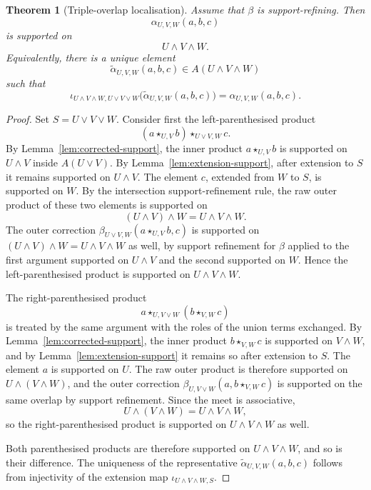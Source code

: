 \documentclass[11pt]{article}
\newtheorem{theorem}{Theorem}[section]
\begin{document}
\begin{theorem}[Triple-overlap localisation]\label{thm:triple-localisation}
Assume that \(\beta\) is support-refining. Then
\[
\alpha_{U,V,W}(a,b,c)
\]
is supported on
\[
U\wedge V\wedge W.
\]
Equivalently, there is a unique element
\[
\widetilde\alpha_{U,V,W}(a,b,c)\in A(U\wedge V\wedge W)
\]
such that
\[
\iota_{U\wedge V\wedge W,U\vee V\vee W}\bigl(\widetilde\alpha_{U,V,W}(a,b,c)\bigr)
=
\alpha_{U,V,W}(a,b,c).
\]
\end{theorem}

\begin{proof}
Set \(S=U\vee V\vee W\). Consider first the left-parenthesised product
\[
(a\star_{U,V}b)\star_{U\vee V,W}c.
\]
By Lemma~\ref{lem:corrected-support}, the inner product \(a\star_{U,V}b\) is supported on \(U\wedge V\) inside \(A(U\vee V)\). By Lemma~\ref{lem:extension-support}, after extension to \(S\) it remains supported on \(U\wedge V\). The element \(c\), extended from \(W\) to \(S\), is supported on \(W\). By the intersection support-refinement rule, the raw outer product of these two elements is supported on
\[
(U\wedge V)\wedge W=U\wedge V\wedge W.
\]
The outer correction \(\beta_{U\vee V,W}(a\star_{U,V}b,c)\) is supported on \((U\wedge V)\wedge W=U\wedge V\wedge W\) as well, by support refinement for \(\beta\) applied to the first argument supported on \(U\wedge V\) and the second supported on \(W\). Hence the left-parenthesised product is supported on \(U\wedge V\wedge W\).

The right-parenthesised product
\[
a\star_{U,V\vee W}(b\star_{V,W}c)
\]
is treated by the same argument with the roles of the union terms exchanged. By Lemma~\ref{lem:corrected-support}, the inner product \(b\star_{V,W}c\) is supported on \(V\wedge W\), and by Lemma~\ref{lem:extension-support} it remains so after extension to \(S\). The element \(a\) is supported on \(U\). The raw outer product is therefore supported on \(U\wedge (V\wedge W)\), and the outer correction \(\beta_{U,V\vee W}(a,b\star_{V,W}c)\) is supported on the same overlap by support refinement. Since the meet is associative,
\[
U\wedge (V\wedge W)=U\wedge V\wedge W,
\]
so the right-parenthesised product is supported on \(U\wedge V\wedge W\) as well.

Both parenthesised products are therefore supported on \(U\wedge V\wedge W\), and so is their difference. The uniqueness of the representative \(\widetilde\alpha_{U,V,W}(a,b,c)\) follows from injectivity of the extension map \(\iota_{U\wedge V\wedge W,S}\).
\end{proof}
\end{document}
